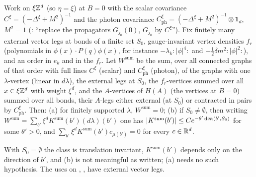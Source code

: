 \begin{lemma}\label{sup2:lem:S8sum}
Work on $\xi\mathbb Z^d$ (so $\eta=\xi$) at $B=0$ with the scalar covariance $C^\xi=(-\Delta^\xi+M^2)^{-1}$ and the photon covariance $C^\xi_{\mathrm{ph}}=(-\Delta^\xi+M^2)^{-1}\otimes\mathbf 1_d$, $M^2=1$ (\cite[p.~442]{Ba3}: ``replace the propagators $G_{j_0}(0)$, $G_{j_0}$ by $C^\xi$''). Fix finitely many external vector legs at bonds of a finite set $S_0$, gauge-invariant vertex densities $f_r$ (polynomials in $\phi(x)\cdot P(q)\phi(x)$, for instance $-\lambda_k:\!|\phi|^4\!:$ and $-\frac12\delta m^2:\!|\phi|^2\!:$), and an order in $e_k$ and in the $f_r$. Let $W^{\mathrm{sum}}$ be the sum, over all connected graphs of that order with full lines $C^\xi$ (scalar) and $C^\xi_{\mathrm{ph}}$ (photon), of the graphs with one $\lambda$-vertex (linear in $d\lambda$), the external legs at $S_0$, the $f_r$-vertices summed over all $x\in\xi\mathbb Z^d$ with weight $\xi^d$, and the $A$-vertices of $H(A)$ (the vertices \cite[(1.8), (1.10)]{Ba3} at $B=0$) summed over all bonds, their $A$-legs either external (at $S_0$) or contracted in pairs by $C^\xi_{\mathrm{ph}}$. Then: \textup{(a)} for finitely supported $\lambda$, $W^{\mathrm{sum}}=0$; \textup{(b)} if $S_0\ne\emptyset$, then writing $W^{\mathrm{sum}}=\sum_{b'}\xi^dK^{\mathrm{sum}}(b')(d\lambda)(b')$ one has $|K^{\mathrm{sum}}(b')|\le Ce^{-\theta'\operatorname{dist}(b',S_0)}$ for some $\theta'>0$, and $\sum_{b'}\xi^dK^{\mathrm{sum}}(b')c_{\mu(b')}=0$ for every $c\in\mathbb R^d$.
\end{lemma}

With $S_0=\emptyset$ the class is translation invariant, $K^{\mathrm{sum}}(b')$ depends only on the direction of $b'$, and (b) is not meaningful as written; (a) needs no such hypothesis. The uses on \cite[p.~442]{Ba3}, \cite[(3.29), (3.31)--(3.32)]{Ba3}, have external vector legs.

